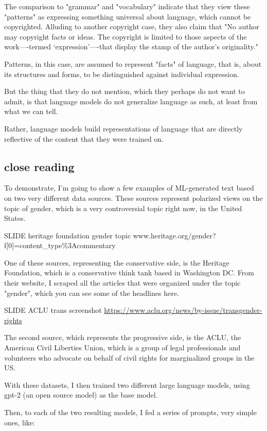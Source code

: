 \documentclass[11pt]{article}
\begin{document}
The comparison to "grammar" and "vocabulary" indicate that they view
these "patterns" as expressing something universal about language,
which cannot be copyrighted. Alluding to another copyright case, they
also claim that "No author may copyright facts or ideas. The copyright
is limited to those aspects of the work—-termed ‘expression’—-that
display the stamp of the author’s originality."

Patterns, in this case, are assumed to represent "facts" of language,
that is, about its structures and forms, to be distinguished against
individual expression. 

But the thing that they do not mention, which they perhaps do not want to
admit, is that language models do not generalize language as such, at
least from what we can tell.

Rather, language models build representations of language that are
directly reflective of the content that they were trained on.

\subsection{close reading}
\label{sec:org846437a}
To demonstrate, I'm going to show a few examples of ML-generated text
based on two very different data sources. These sources represent
polarized views on the topic of gender, which is a very controversial
topic right now, in the United States.

SLIDE heritage foundation gender topic
www.heritage.org/gender?f[0]=content\_type\%3Acommentary

One of these sources, representing the conservative side, is the
Heritage Foundation, which is a conservative think tank based in
Washington DC. From their website, I scraped all the articles that
were organized under the topic "gender", which you can see some of the
headlines here.

SLIDE ACLU trans screenshot
\url{https://www.aclu.org/news/by-issue/transgender-rights} 

The second source, which represents the progressive side, is the ACLU,
the American Civil Liberties Union, which is a group of legal
professionals and volunteers who advocate on behalf of civil rights
for marginalized groups in the US.

With these datasets, I then trained two different large language
models, using gpt-2 (an open source model) as the base model.

Then, to each of the two resulting models, I fed a series of prompts,
very simple ones, like: 
\end{document}
